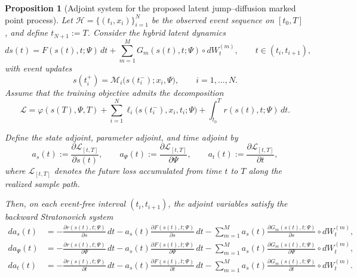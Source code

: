 \documentclass[11pt]{article}
\newtheorem{proposition}{Proposition}
\theoremstyle{definition}
\numberwithin{equation}{section}
\numberwithin{theorem}{section}
\numberwithin{proposition}{section}
\numberwithin{lemma}{section}
\numberwithin{corollary}{section}
\numberwithin{definition}{section}
\numberwithin{remark}{section}
\newcommand{\1}{\mathbbm{1}}
\begin{document}
\begin{proposition}[Adjoint system for the proposed latent jump--diffusion marked point process]
\label{prop:neural_jsde_adjoint}
Let $\mathcal H=\{(t_i,x_i)\}_{i=1}^N$ be the observed event sequence on $[t_0,T]$, and define $t_{N+1}:=T$. 
Consider the hybrid latent dynamics
\begin{equation}
\label{eq:hybrid_forward_general}
ds(t)
=
F(s(t),t;\Psi)\,dt
+
\sum_{m=1}^M G_m(s(t),t;\Psi)\circ dW_t^{(m)},
\qquad t\in (t_i,t_{i+1}),
\end{equation}
with event updates
\begin{equation}
\label{eq:event_map_general}
s(t_i^+)=\mathcal M_i\bigl(s(t_i^-);x_i,\Psi\bigr), \qquad i=1,\dots,N.
\end{equation}
Assume that the training objective admits the decomposition
\begin{equation}
\label{eq:loss_general}
\mathcal L
=
\varphi(s(T),\Psi,T)
+
\sum_{i=1}^N \ell_i\bigl(s(t_i^-),x_i,t_i;\Psi\bigr)
+
\int_{t_0}^{T} r(s(t),t;\Psi)\,dt.
\end{equation}

Define the state adjoint, parameter adjoint, and time adjoint by
\begin{equation}
\label{eq:adjoint_definition}
a_s(t):=\frac{\partial \mathcal L_{[t,T]}}{\partial s(t)},
\qquad
a_\Psi(t):=\frac{\partial \mathcal L_{[t,T]}}{\partial \Psi},
\qquad
a_t(t):=\frac{\partial \mathcal L_{[t,T]}}{\partial t},
\end{equation}
where $\mathcal L_{[t,T]}$ denotes the future loss accumulated from time $t$ to $T$ along the realized sample path.

Then, on each event-free interval $(t_i,t_{i+1})$, the adjoint variables satisfy the backward Stratonovich system
\begin{align}
\label{eq:adjoint_state_cont}
da_s(t)
&=
-\frac{\partial r(s(t),t;\Psi)}{\partial s}\,dt
-a_s(t)\frac{\partial F(s(t),t;\Psi)}{\partial s}\,dt
-\sum_{m=1}^M a_s(t)\frac{\partial G_m(s(t),t;\Psi)}{\partial s}\circ dW_t^{(m)},\\
\label{eq:adjoint_param_cont}
da_\Psi(t)
&=
-\frac{\partial r(s(t),t;\Psi)}{\partial \Psi}\,dt
-a_s(t)\frac{\partial F(s(t),t;\Psi)}{\partial \Psi}\,dt
-\sum_{m=1}^M a_s(t)\frac{\partial G_m(s(t),t;\Psi)}{\partial \Psi}\circ dW_t^{(m)},\\
\label{eq:adjoint_time_cont}
da_t(t)
&=
-\frac{\partial r(s(t),t;\Psi)}{\partial t}\,dt
-a_s(t)\frac{\partial F(s(t),t;\Psi)}{\partial t}\,dt
-\sum_{m=1}^M a_s(t)\frac{\partial G_m(s(t),t;\Psi)}{\partial t}\circ dW_t^{(m)}.
\end{align}


\end{proposition}
\end{document}

